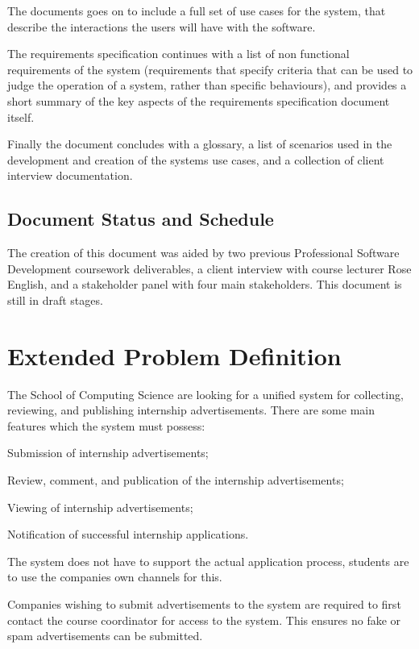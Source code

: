 \documentclass{l3deliverable}
\begin{document}
The documents goes on to include a full set of use cases for the system, that
describe the interactions the users will have with the software. 

The requirements specification continues with a list of non functional
requirements of the system (requirements that specify criteria that can be used
to judge the operation of a system, rather than specific behaviours), and 
provides a short summary of the key aspects of the requirements specification
document itself.

Finally the document concludes with a glossary, a list of scenarios used in the
development and creation of the systems use cases, and a collection of client
interview documentation. 

\subsection{Document Status and Schedule}

The creation of this document was aided by two previous Professional Software
Development coursework deliverables, a client interview with course
lecturer Rose English, and a stakeholder panel with four main stakeholders.
This document is still in draft stages.


\section{Extended Problem Definition}


The School of Computing Science are looking for a unified system for 
collecting, reviewing, and publishing internship advertisements. There are 
some main features which the system must possess: 

Submission of internship advertisements;

Review, comment, and publication of the internship advertisements;

Viewing of internship advertisements;

Notification of successful internship applications.

The system does not have to support the actual application process, students
are to use the companies own channels for this.

Companies wishing to submit advertisements to the system are required to first
contact the course coordinator for access to the system. This ensures no fake
or spam advertisements can be submitted.
\end{document}
